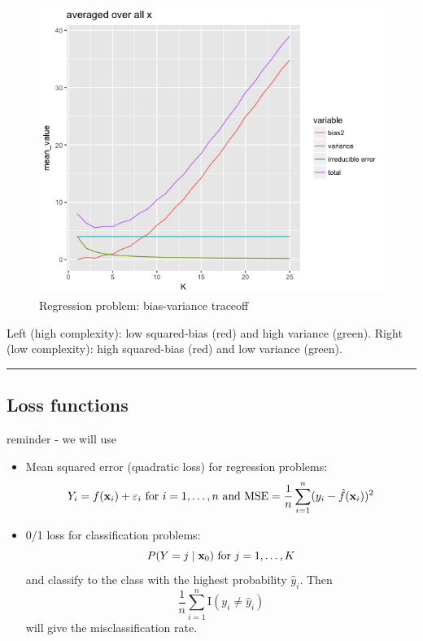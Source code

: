\documentclass[]{article}
\begin{document}
\begin{figure}
\centering
\includegraphics{Prob1f4.png}
\caption{Regression problem: bias-variance traceoff}
\end{figure}

Left (high complexity): low squared-bias (red) and high variance
(green). Right (low complexity): high squared-bias (red) and low
variance (green).

\begin{center}\rule{0.5\linewidth}{\linethickness}\end{center}

\hypertarget{loss-functions}{%
\subsection{Loss functions}\label{loss-functions}}

reminder - we will use

\begin{itemize}
\item
  Mean squared error (quadratic loss) for regression problems:
  \[Y_i=f({\bf x}_i)+\varepsilon_i \text{ for }i=1,\ldots,n \text{ and } \text{MSE}=\frac{1}{n}\sum_{i=1}^n (y_i-\hat{f}({\bf x}_i))^2\]
\item
  0/1 loss for classification problems:
  \[P(Y=j\mid {\bf x}_0) \text{ for }j=1,\ldots,K \] and classify to the
  class with the highest probability \(\hat{y}_i\). Then
  \[\frac{1}{n}\sum_{i=1}^n \text{I}(y_i \neq \hat{y}_i)\] will give the
  misclassification rate.
\end{itemize}
\end{document}
